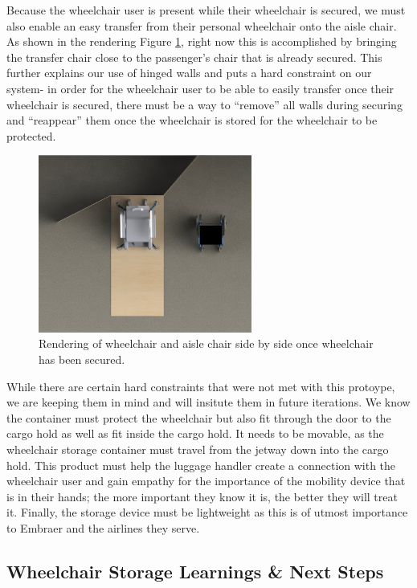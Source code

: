 Because the wheelchair user is present while their wheelchair is secured, we must also enable an easy transfer from their personal wheelchair onto the aisle chair. As shown in the rendering  Figure \ref{fig:storagetransfer.png}, right now this is accomplished by bringing the transfer chair close to the passenger's chair that is already secured. This further explains our use of hinged walls and puts a hard constraint on our system- in order for the wheelchair user to be able to easily transfer once their wheelchair is secured, there must be a way to ``remove'' all walls during securing and ``reappear'' them once the wheelchair is stored for the wheelchair to be protected.

\begin{figure}[h]
  \centering
     \includegraphics[width=7cm]{images/storagetransfer.png}
   \caption{Rendering of wheelchair and aisle chair side by side once wheelchair has been secured.}
  \label{fig:storagetransfer.png}
\end{figure}

While there are certain hard constraints that were not met with this protoype, we are keeping them in mind and will insitute them in future iterations. We know the container must protect the wheelchair but also fit through the door to the cargo hold as well as fit inside the cargo hold. It needs to be movable, as the wheelchair storage container must travel from the jetway down into the cargo hold. This product must help the luggage handler create a connection with the wheelchair user and gain empathy for the importance of the mobility device that is in their hands; the more important they know it is, the better they will treat it. Finally, the storage device must be lightweight as this is of utmost importance to Embraer and the airlines they serve.

\subsection{Wheelchair Storage Learnings \& Next Steps}

